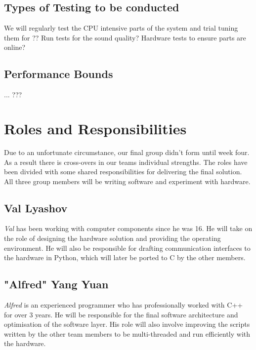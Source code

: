 \documentclass[11pt,a4paper,titlepage]{report}
\begin{document}
\subsection{Types of Testing to be conducted}

{\color{red} 

We will regularly test the CPU intensive parts of the system and trial tuning them for ?? Run tests for the sound quality? Hardware tests to ensure parts are online?

}


\subsection{Performance Bounds}

{\color{red} ... ??? }




\section{Roles and Responsibilities}



Due to an unfortunate circumstance, our final group didn't form until week four. As a result there is cross-overs in our teams individual strengths. The roles have been divided with some shared responsibilities for delivering the final solution. All three group members will be writing software and experiment with hardware.


\subsection{Val Lyashov}
\textit{Val} has been working with computer components since he was 16. He will take on the role of designing the hardware solution and providing the operating environment. He will also be responsible for drafting communication interfaces to the hardware in Python, which will later be ported to C by the other members.


\subsection{"Alfred" Yang Yuan}
\textit{Alfred} is an experienced programmer who has professionally worked with C++ for over 3 years. He will be responsible for the final software architecture and optimisation of the software layer. His role will also involve improving the scripts written by the other team members to be multi-threaded and run efficiently with the hardware.
\end{document}
